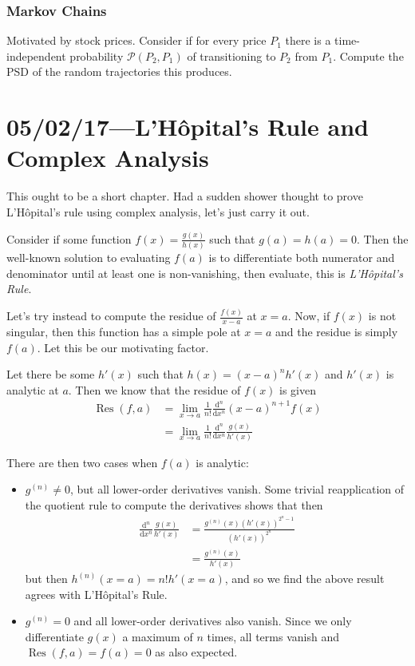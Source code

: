 \documentclass[12pt]{report}
\DeclareMathOperator{\Res}{Res}
\begin{document}
\subsection{Markov Chains}

Motivated by stock prices. Consider if for every price $P_1$ there is a
time-independent probability $\mathcal{P}(P_2, P_1)$ of transitioning to $P_2$
from $P_1$. Compute the PSD of the random trajectories this produces.

\chapter{05/02/17---L'H\^opital's Rule and Complex Analysis}

This ought to be a short chapter. Had a sudden shower thought to prove
L'H\^opital's rule using complex analysis, let's just carry it out.

Consider if some function $f(x) = \frac{g(x)}{h(x)}$ such that $g(a) = h(a) =
0$. Then the well-known solution to evaluating $f(a)$ is to differentiate both
numerator and denominator until at least one is non-vanishing, then evaluate,
this is \emph{L'H\^opital's Rule}.

Let's try instead to compute the residue of $\frac{f(x)}{x - a}$ at $x = a$.
Now, if $f(x)$ is not singular, then this function has a simple pole at $x = a$
and the residue is simply $f(a)$. Let this be our motivating factor.

Let there be some $h'(x)$ such that $h(x) = (x-a)^nh'(x)$ and $h'(x)$ is
analytic at $a$. Then we know that the residue of $f(x)$ is given
\begin{align}
    \Res(f, a)
        &= \lim_{x \to a}\frac{1}{n!}
            \frac{\mathrm{d}^n}{\mathrm{d}x^n}
            (x - a)^{n+1} f(x)\\
        &= \lim_{x \to a}\frac{1}{n!}
            \frac{\mathrm{d}^n}{\mathrm{d}x^n}
            \frac{g(x)}{h'(x)} \nonumber
\end{align}

There are then two cases when $f(a)$ is analytic:
\begin{itemize}
    \item $g^{(n)} \neq 0$, but all lower-order derivatives vanish. Some trivial
        reapplication of the quotient rule to compute the derivatives shows that
        then
        \begin{align*}
            \frac{\mathrm{d}^n}{\mathrm{d}x^n} \frac{g(x)}{h'(x)}
                &= \frac{g^{(n)}(x)(h'(x))^{2^n - 1}}{(h'(x))^{2^n}}\\
                &= \frac{g^{(n)}(x)}{h'(x)}
        \end{align*}
        but then $h^{(n)}(x = a) = n! h'(x=a)$, and so we find the above result
        agrees with L'H\^opital's Rule.

    \item $g^{(n)} = 0$ and all lower-order derivatives also vanish. Since we
        only differentiate $g(x)$ a maximum of $n$ times, all terms vanish and
        $\Res(f, a) = f(a) = 0$ as also expected.
\end{itemize}
\end{document}
